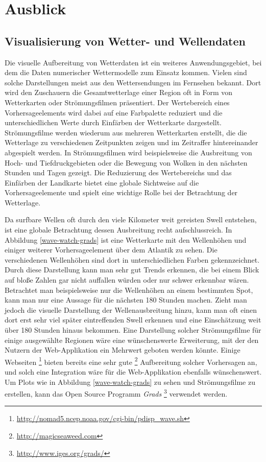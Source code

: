 \chapter{Ausblick}

\section{Visualisierung von Wetter- und Wellendaten}
Die visuelle Aufbereitung von Wetterdaten ist ein weiteres
Anwendungsgebiet, bei dem die Daten numerischer Wettermodelle zum
Einsatz kommen. Vielen sind solche Darstellungen meist aus den
Wettersendungen im Fernsehen bekannt. Dort wird den Zuschauern die
Gesamtwetterlage einer Region oft in Form von Wetterkarten oder
Strömungsfilmen präsentiert. Der Wertebereich eines Vorhersageelements
wird dabei auf eine Farbpalette reduziert und die unterschiedlichen
Werte durch Einfärben der Wetterkarte dargestellt. Strömungsfilme
werden wiederum aus mehreren Wetterkarten erstellt, die die Wetterlage
zu verschiedenen Zeitpunkten zeigen und im Zeitraffer hintereinander
abgespielt werden. In Strömungsfilmen wird beispielsweise die
Ausbreitung von Hoch- und Tiefdruckgebieten oder die Bewegung von
Wolken in den nächsten Stunden und Tagen gezeigt. Die Reduzierung des
Wertebereichs und das Einfärben der Landkarte bietet eine globale
Sichtweise auf die Vorhersageelemente und spielt eine wichtige Rolle
bei der Betrachtung der Wetterlage.

Da surfbare Wellen oft durch den viele Kilometer weit gereisten Swell
entstehen, ist eine globale Betrachtung dessen Ausbreitung recht
aufschlussreich. In Abbildung \ref{wave-watch-grads} ist eine
Wetterkarte mit den Wellenhöhen und einiger weiterer Vorhersageelement
über dem Atlantik zu sehen. Die verschiedenen Wellenhöhen sind dort in
unterschiedlichen Farben gekennzeichnet. Durch diese Darstellung kann
man sehr gut Trends erkennen, die bei einem Blick auf bloße Zahlen gar
nicht auffallen würden oder nur schwer erkennbar wären. Betrachtet man
beispielsweise nur die Wellenhöhen an einem bestimmten Spot, kann man
nur eine Aussage für die nächsten 180 Stunden machen. Zieht man jedoch
die visuelle Darstellung der Wellenausbreitung hinzu, kann man oft
einen dort erst sehr viel später eintreffenden Swell erkennen und eine
Einschätzung weit über 180 Stunden hinaus bekommen. Eine Darstellung
solcher Strömungsfilme für einige ausgewählte Regionen wäre eine
wünschenswerte Erweiterung, mit der den Nutzern der Web-Applikation
ein Mehrwert geboten werden könnte. Einige Webseiten
\footnote{\url{http://nomad5.ncep.noaa.gov/cgi-bin/pdisp_wave.sh}}
bieten bereits eine sehr gute \footnote{\url{http://magicseaweed.com}}
Aufbereitung solcher Vorhersagen an, und solch eine Integration wäre
für die Web-Applikation ebenfalls wünschenswert. Um Plots wie in
Abbildung \ref{wave-watch-grads} zu sehen und Strömungsfilme zu
erstellen, kann das Open Source Programm \textit{Grads}
\footnote{\url{http://www.iges.org/grads/}} verwendet werden.

